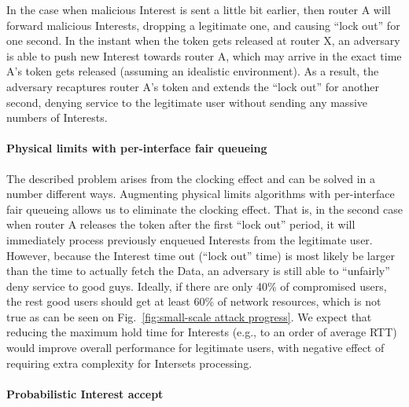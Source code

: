 In the case when malicious Interest is sent a little bit earlier, then router A will forward malicious Interests, dropping a legitimate one, and causing ``lock out'' for one second.
In the instant when the token gets released at router X, an adversary is able to push new Interest towards router A, which may arrive in the exact time A's token gets released (assuming an idealistic environment).
As a result, the adversary recaptures router A's token and extends the ``lock out'' for another second, denying service to the legitimate user without sending any massive numbers of Interests.

\paragraph{\textbf{Physical limits with per-interface fair queueing}}

The described problem arises from the clocking effect and can be solved in a number different ways.
Augmenting physical limits algorithms with per-interface fair queueing allows us to eliminate the clocking effect. 
That is, in the second case when router A releases the token after the first ``lock out'' period, it will immediately process previously enqueued Interests from the legitimate user.
However, because the Interest time out (``lock out'' time) is most likely be larger than the time to actually fetch the Data, an adversary is still able to ``unfairly'' deny service to good guys.
Ideally, if there are only 40\% of compromised users, the rest good users should get at least 60\% of network resources, which is not true as can be seen on Fig.~\ref{fig:small-scale attack progress}.
We expect that reducing the maximum hold time for Interests (e.g., to an order of average RTT) would improve overall performance for legitimate users, with negative effect of requiring extra complexity for Intersets processing.

\paragraph{\textbf{Probabilistic Interest accept}}

